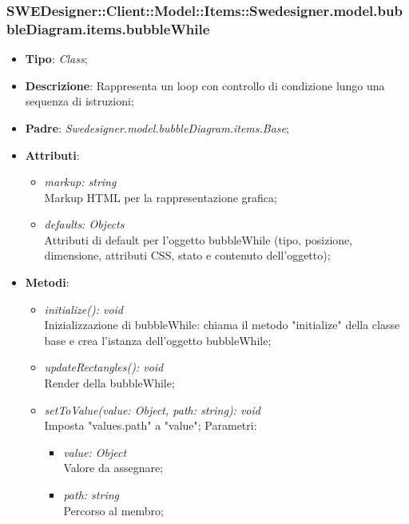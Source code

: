 \documentclass[../DefinizioneDiProdotto.tex]{subfiles}
\begin{document}
			\subsubsection{SWEDesigner::Client::Model::Items::Swedesigner.model.bubbleDiagram.items.bubbleWhile}
			\hypertarget{SWEDesigner::Client::Model::Items::Swedesigner.model.bubbleDiagram.items.bubbleWhile}{}
			\begin{itemize}
				\item \textbf{Tipo}: \emph{Class};
				\item \textbf{Descrizione}: Rappresenta un loop con controllo di condizione lungo una sequenza di istruzioni;
				\item \textbf{Padre}: \emph{Swedesigner.model.bubbleDiagram.items.Base};
				\item \textbf{Attributi}:
				\begin{itemize}
					\item \emph{markup: string}\\
					Markup HTML per la rappresentazione grafica;
					\item \emph{defaults: Objects}\\
					Attributi di default per l'oggetto bubbleWhile (tipo, posizione, dimensione, attributi CSS, stato e contenuto dell'oggetto);
				\end{itemize}
				\item \textbf{Metodi}:
				\begin{itemize}
					\item \emph{initialize(): void}\\
					Inizializzazione di bubbleWhile: chiama il metodo "initialize" della classe base e crea l'istanza dell'oggetto bubbleWhile;
					\item \emph{updateRectangles(): void}\\
					Render della bubbleWhile;
					\item \emph{setToValue(value: Object, path: string): void}\\
					Imposta "values.path" a "value";
					Parametri:
					\begin{itemize}
						\item \emph{value: Object} \\
						Valore da assegnare;
						\item \emph{path: string} \\
						Percorso al membro;
					\end{itemize}
				\end{itemize}
			\end{itemize}
			
\end{document}
